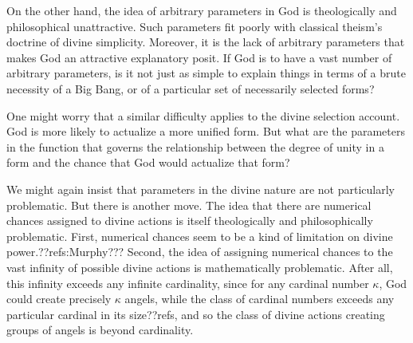 On the other hand, the idea of arbitrary parameters in God is theologically and philosophical unattractive. Such parameters fit poorly 
with classical theism's doctrine of divine simplicity. Moreover, it is the lack of arbitrary parameters that makes God an attractive 
explanatory posit. If God is to have a vast number of arbitrary parameters, is it not just as simple to explain things in terms of 
a brute necessity of a Big Bang, or of a particular set of necessarily selected forms? 

One might worry that a similar difficulty applies to the divine selection account. God is more likely to actualize a more unified 
form. But what are the parameters in the function that governs the relationship between the degree of unity in a form and the chance that 
God would actualize that form? 

We might again insist that parameters in the divine nature are not particularly problematic.
But there is another move. The idea that there are numerical chances assigned to divine actions is itself theologically and philosophically
problematic. First, numerical chances seem to be a kind of limitation on divine power.??refs:Murphy??? Second, the idea of assigning 
numerical chances to the vast infinity of possible divine actions is mathematically problematic. After all, this infinity exceeds any infinite cardinality, since for any
cardinal number $\kappa$, God could create precisely $\kappa$ angels, while the class of cardinal numbers exceeds any particular cardinal 
in its size??refs, and so the class of divine actions creating groups of angels is beyond cardinality.

